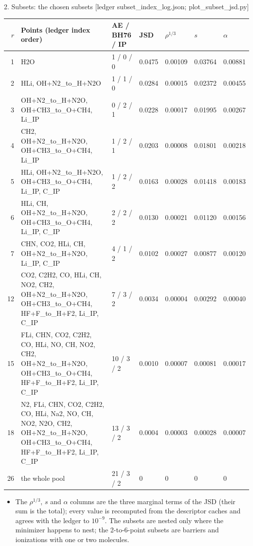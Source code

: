 \begin{frame}{2. Subsets: the chosen subsets [ledger subset\_index\_log.json; plot\_subset\_jsd.py]}
  \begin{center}\tiny\setlength{\tabcolsep}{2pt}
  \begin{tabular}{rp{7.6cm}lllll}
  \toprule
  $r$ & Points (ledger index order) & AE / BH76 / IP & JSD & $\rho^{1/3}$ & $s$ & $\alpha$ \\ \midrule
  1 & H2O & 1 / 0 / 0 & 0.0475 & 0.00109 & 0.03764 & 0.00881 \\
  2 & HLi, OH+N2\_to\_H+N2O & 1 / 1 / 0 & 0.0284 & 0.00015 & 0.02372 & 0.00455 \\
  3 & OH+N2\_to\_H+N2O, OH+CH3\_to\_O+CH4, Li\_IP & 0 / 2 / 1 & 0.0228 & 0.00017 & 0.01995 & 0.00267 \\
  4 & CH2, OH+N2\_to\_H+N2O, OH+CH3\_to\_O+CH4, Li\_IP & 1 / 2 / 1 & 0.0203 & 0.00008 & 0.01801 & 0.00218 \\
  5 & HLi, OH+N2\_to\_H+N2O, OH+CH3\_to\_O+CH4, Li\_IP, C\_IP & 1 / 2 / 2 & 0.0163 & 0.00028 & 0.01418 & 0.00183 \\
  6 & HLi, CH, OH+N2\_to\_H+N2O, OH+CH3\_to\_O+CH4, Li\_IP, C\_IP & 2 / 2 / 2 & 0.0130 & 0.00021 & 0.01120 & 0.00156 \\
  7 & CHN, CO2, HLi, CH, OH+N2\_to\_H+N2O, Li\_IP, C\_IP & 4 / 1 / 2 & 0.0102 & 0.00027 & 0.00877 & 0.00120 \\
  12 & CO2, C2H2, CO, HLi, CH, NO2, CH2, OH+N2\_to\_H+N2O, OH+CH3\_to\_O+CH4, HF+F\_to\_H+F2, Li\_IP, C\_IP & 7 / 3 / 2 & 0.0034 & 0.00004 & 0.00292 & 0.00040 \\
  15 & FLi, CHN, CO2, C2H2, CO, HLi, NO, CH, NO2, CH2, OH+N2\_to\_H+N2O, OH+CH3\_to\_O+CH4, HF+F\_to\_H+F2, Li\_IP, C\_IP & 10 / 3 / 2 & 0.0010 & 0.00007 & 0.00081 & 0.00017 \\
  18 & N2, FLi, CHN, CO2, C2H2, CO, HLi, Na2, NO, CH, NO2, N2O, CH2, OH+N2\_to\_H+N2O, OH+CH3\_to\_O+CH4, HF+F\_to\_H+F2, Li\_IP, C\_IP & 13 / 3 / 2 & 0.0004 & 0.00003 & 0.00028 & 0.00007 \\
  26 & the whole pool & 21 / 3 / 2 & 0 & 0 & 0 & 0 \\
  \bottomrule
  \end{tabular}
  \end{center}
  \scriptsize
  \begin{itemize}
    \item The $\rho^{1/3}$, $s$ and $\alpha$ columns are the three marginal terms of the JSD (their sum is the total); every value is recomputed from the descriptor caches and agrees with the ledger to $10^{-9}$. The subsets are nested only where the minimizer happens to nest; the 2-to-6-point subsets are barriers and ionizations with one or two molecules.
  \end{itemize}
\end{frame}
